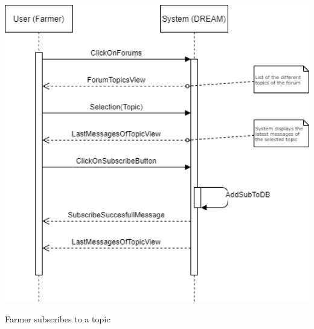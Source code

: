 \documentclass{article}
\begin{document}
\begin{center}
    \includegraphics[width=1.0\textwidth]{images/sequenceDiagrams/10. FarmerTopicSubscribe.png}
    \par
    \caption{\label{fig:frog}Farmer subscribes to a topic}

    \newpage
    
    
    
    
    
    

\end{center}
\end{document}
